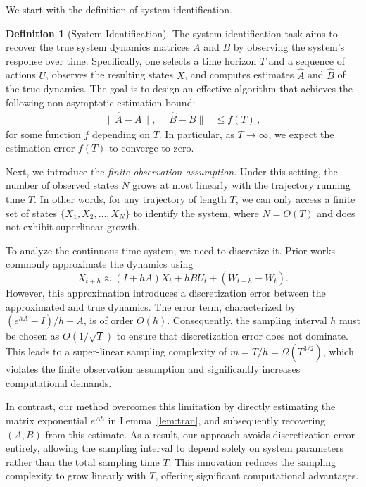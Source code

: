 \documentclass{article}
\theoremstyle{definition}
\newtheorem{definition}{Definition}
\begin{document}
We start with the definition of system identification.

\begin{definition}[System Identification]
The system identification task aims to recover the true system dynamics matrices $A$ and $B$ by observing the system's response over time. Specifically, one selects a time horizon $T$ and a sequence of actions $U$, observes the resulting states $X$, and computes estimates $\hat{A}$ and $\hat{B}$ of the true dynamics. The goal is to design an effective algorithm that achieves the following non-asymptotic estimation bound:
\begin{align*}
\|\hat{A} - A\|,\ \|\hat{B} - B\| &\leq f(T)\,,
\end{align*}
for some function $f$ depending on $T$. In particular, as $T \to \infty$, we expect the estimation error $f(T)$ to converge to zero.
\end{definition}

Next, we introduce the \emph{finite observation assumption}. Under this setting, the number of observed states $N$ grows at most linearly with the trajectory running time $T$. In other words, for any trajectory of length $T$, we can only access a finite set of states $\{X_{1}, X_{2}, \dots, X_{N}\}$ to identify the system, where $N = O(T)$ and does not exhibit superlinear growth.

To analyze the continuous-time system, we need to discretize it. Prior works~\cite{ref3, shirani2022thompson, ref1} commonly approximate the dynamics using
\[
X_{t+h} \approx (I + hA)X_t + hBU_t + (W_{t+h} - W_t).
\]
However, this approximation introduces a discretization error between the approximated and true dynamics. The error term, characterized by $(e^{hA} - I)/h - A$, is of order $O(h)$. Consequently, the sampling interval $h$ must be chosen as $O(1/\sqrt{T})$ to ensure that discretization error does not dominate. This leads to a super-linear sampling complexity of $m = T/h = \Omega(T^{3/2})$, which violates the finite observation assumption and significantly increases computational demands.

In contrast, our method overcomes this limitation by directly estimating the matrix exponential $e^{Ah}$ in Lemma~\ref{lem:tran}, and subsequently recovering $(A, B)$ from this estimate. As a result, our approach avoids discretization error entirely, allowing the sampling interval to depend solely on system parameters rather than the total sampling time $T$. This innovation reduces the sampling complexity to grow linearly with $T$, offering significant computational advantages.
\end{document}
